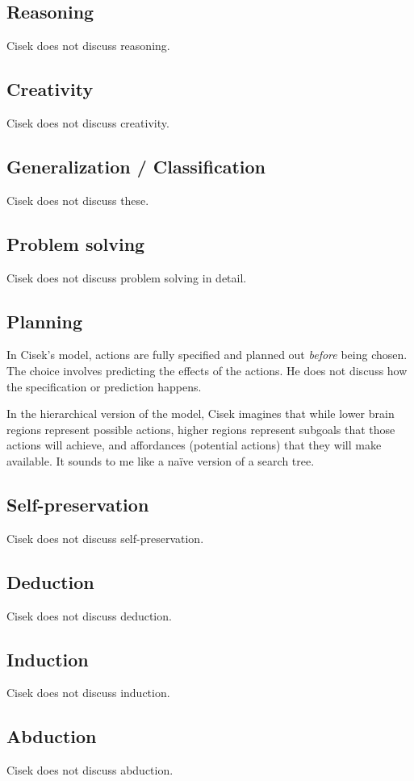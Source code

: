 \documentclass[10pt,a4paper]{article}
\begin{document}
\subsection{Reasoning}
Cisek does not discuss reasoning.

\subsection{Creativity}
Cisek does not discuss creativity.

\subsection{Generalization / Classification}
Cisek does not discuss these.

\subsection{Problem solving}
Cisek does not discuss problem solving in detail.

\subsection{Planning}
In Cisek's model, actions are fully specified and planned out \emph{before} being chosen. The choice involves predicting the effects of the actions. He does not discuss how the specification or prediction happens.

In the hierarchical version of the model, Cisek imagines that while lower brain regions represent possible actions, higher regions represent subgoals that those actions will achieve, and affordances (potential actions) that they will make available. It sounds to me like a na\"{i}ve version of a search tree.

\subsection{Self-preservation}
Cisek does not discuss self-preservation.

\subsection{Deduction}
Cisek does not discuss deduction.

\subsection{Induction}
Cisek does not discuss induction.

\subsection{Abduction}
Cisek does not discuss abduction.


\end{document}
